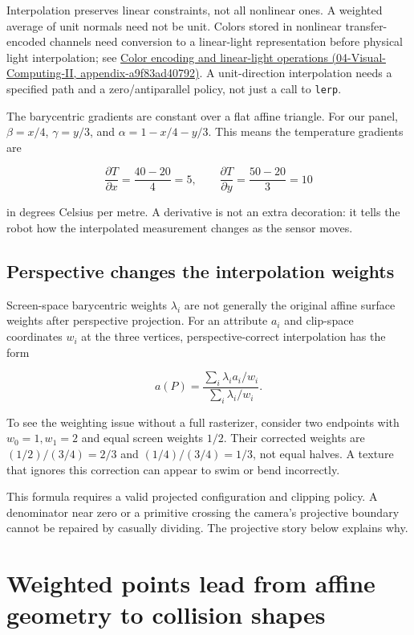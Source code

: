 Interpolation preserves linear constraints, not all nonlinear ones. A weighted average of unit normals need not be unit. Colors stored in nonlinear transfer-encoded channels need conversion to a linear-light representation before physical light interpolation; see \href{../04-Visual-Computing-II/main.pdf\#nameddest=appendix-a9f83ad40792}{Color encoding and linear-light operations (04-Visual-Computing-II, appendix-a9f83ad40792)}. A unit-direction interpolation needs a specified path and a zero/antiparallel policy, not just a call to \texttt{lerp}.

The barycentric gradients are constant over a flat affine triangle. For our panel, \(\beta=x/4\), \(\gamma=y/3\), and \(\alpha=1-x/4-y/3\). This means the temperature gradients are

\[
\frac{\partial T}{\partial x}=\frac{40-20}{4}=5,
\qquad
\frac{\partial T}{\partial y}=\frac{50-20}{3}=10
\]

in degrees Celsius per metre. A derivative is not an extra decoration: it tells the robot how the interpolated measurement changes as the sensor moves.

\subsection{Perspective changes the interpolation weights}\label{01-foundations-i-ch018-perspective-changes-the-interpolation-weights}

Screen-space barycentric weights \(\lambda_i\) are not generally the original affine surface weights after perspective projection. For an attribute \(a_i\) and clip-space coordinates \(w_i\) at the three vertices, perspective-correct interpolation has the form

\[
a(P)=\frac{\sum_i\lambda_i a_i/w_i}{\sum_i\lambda_i/w_i}.
\]

To see the weighting issue without a full rasterizer, consider two endpoints with \(w_0=1,w_1=2\) and equal screen weights \(1/2\). Their corrected weights are \((1/2)/(3/4)=2/3\) and \((1/4)/(3/4)=1/3\), not equal halves. A texture that ignores this correction can appear to swim or bend incorrectly.

This formula requires a valid projected configuration and clipping policy. A denominator near zero or a primitive crossing the camera's projective boundary cannot be repaired by casually dividing. The projective story below explains why.

\section{Weighted points lead from affine geometry to collision shapes}\label{01-foundations-i-ch018-weighted-points-lead-from-affine-geometry-to-collision-shapes}

